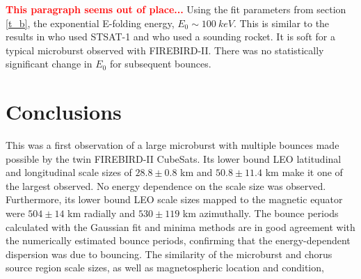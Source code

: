 \documentclass[draft, linenumbers]{agujournal}
\begin{document}
\textcolor{red}{\textbf{This paragraph seems out of place...}}
 Using the fit parameters from section \ref{t_b},  the exponential E-folding energy,  $E_0 \sim 100 \ keV$. This is similar to the results in \citet{Lee2005} who used STSAT-1 and \citet{Datta1997} who used a sounding rocket. It is soft for a typical microburst observed with FIREBIRD-II. There was no statistically significant change in $E_0$ for subsequent bounces.

\section{Conclusions}
This was a first observation of a large microburst with multiple bounces made possible by the twin FIREBIRD-II CubeSats. Its lower bound LEO latitudinal and longitudinal scale sizes of $28.8 \pm 0.8$ km and $ 50.8 \pm 11.4$  km make it one of the largest observed. No energy dependence on the scale size was observed. Furthermore, its lower bound LEO scale sizes mapped to the magnetic equator were  $504 \pm​ 14$ km radially and $530 \pm 119$ km azimuthally. The bounce periods calculated with the Gaussian fit and minima methods are in good agreement with the numerically estimated bounce periods, confirming that the energy-dependent dispersion was due to bouncing. The similarity of the microburst and chorus source region scale sizes, as well as magnetospheric location and condition, 




\end{document}
